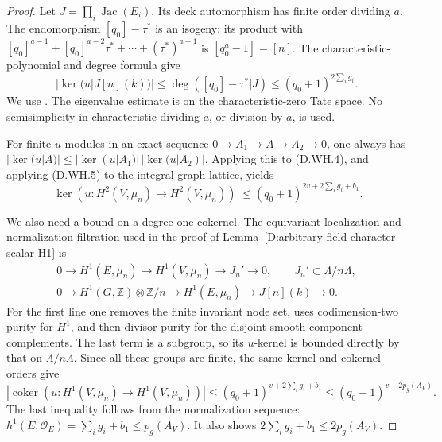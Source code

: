 \begin{proof}
Let \(J=\prod_i\operatorname{Jac}(E_i)\).
Its deck automorphism has finite order dividing \(a\).
The endomorphism \([q_0]-\tau^*\) is an isogeny:
its product with
\([q_0]^{a-1}+[q_0]^{a-2}\tau^*+\cdots+(\tau^*)^{a-1}\)
is \([q_0^a-1]=[n]\).
The characteristic-polynomial and degree formula give
\[
 |\ker(u|J[n](k))|
 \le\deg([q_0]-\tau^*|J)
 \le(q_0+1)^{2\sum_i g_i}.                            \tag{D.WH.7}
\]
We use \citet[Theorem 10.9 and its written proof,
and Proposition 10.20 with Lemmas 10.21--10.22,
printed pp.46--52]{Milne2008AVScalarB}.
The eigenvalue estimate is on the characteristic-zero
Tate space. No semisimplicity in characteristic
dividing \(a\), or division by \(a\), is used.

For finite \(u\)-modules in an exact sequence
\(0\to A_1\to A\to A_2\to0\), one always has
\(|\ker(u|A)|\le|\ker(u|A_1)|\,|\ker(u|A_2)|\).
Applying this to (D.WH.4), and applying (D.WH.5)
to the integral graph lattice, yields
\[
 |\ker(u:H^2(V,\mu_n)\to H^2(V,\mu_n))|
       \le(q_0+1)^{2v+2\sum_i g_i+b_1}.               \tag{D.WH.8}
\]

We also need a bound on a degree-one cokernel.
The equivariant localization and normalization
filtration used in the proof of
Lemma~\ref{D:arbitrary-field-character-scalar-H1} is
\[
 \begin{gathered}
 0\longrightarrow H^1(E,\mu_n)
 \longrightarrow H^1(V,\mu_n)\longrightarrow J_n'
 \longrightarrow0,\qquad J_n'\subset\Lambda/n\Lambda,\\
 0\longrightarrow H^1(G,\mathbb Z)\otimes\mathbb Z/n
 \longrightarrow H^1(E,\mu_n)\longrightarrow J[n](k)
 \longrightarrow0.
 \end{gathered}                                        \tag{D.WH.9}
\]
For the first line one removes the finite invariant
node set, uses codimension-two purity for \(H^1\),
and then divisor purity for the disjoint smooth
component complements. The last term is a subgroup,
so its \(u\)-kernel is bounded directly by that on
\(\Lambda/n\Lambda\).
Since all these groups are finite, the same kernel
and cokernel orders give
\[
 |\operatorname{coker}(u:H^1(V,\mu_n)\to H^1(V,\mu_n))|
 \le(q_0+1)^{v+2\sum_i g_i+b_1}
 \le(q_0+1)^{v+2p_g(A_V)}.                            \tag{D.WH.10}
\]
The last inequality follows from the normalization
sequence:
\(h^1(E,\mathcal O_E)=\sum_i g_i+b_1\le p_g(A_V)\).
It also shows \(2\sum_i g_i+b_1\le2p_g(A_V)\).


\end{proof}
